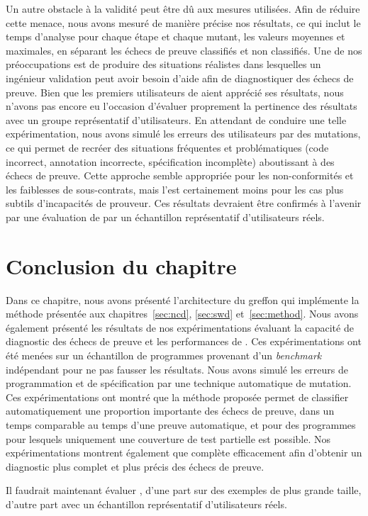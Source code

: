 Un autre obstacle à la validité peut être dû aux mesures utilisées.
Afin de réduire cette menace, nous avons mesuré de manière précise nos
résultats, ce qui inclut le temps d'analyse pour chaque étape et chaque mutant,
les valeurs moyennes et maximales, en séparant les échecs de preuve classifiés
et non classifiés.
Une de nos préoccupations est de produire des situations réalistes dans
lesquelles un ingénieur validation peut avoir besoin d'aide afin de
diagnostiquer des échecs de preuve.
Bien que les premiers utilisateurs de \stady aient apprécié ses résultats, nous
n'avons pas encore eu l'occasion d'évaluer proprement la pertinence des
résultats avec un groupe représentatif d'utilisateurs.
En attendant de conduire une telle expérimentation, nous avons simulé les
erreurs des utilisateurs par des mutations, ce qui permet de recréer des
situations fréquentes et problématiques (code incorrect, annotation incorrecte,
spécification incomplète) aboutissant à des échecs de preuve.
Cette approche semble appropriée pour les non-conformités et les faiblesses de
sous-contrats, mais l'est certainement moins pour les cas plus subtils
d'incapacités de prouveur.
Ces résultats devraient être confirmés à l'avenir par une évaluation de \stady
par un échantillon représentatif d'utilisateurs réels.


\section*{Conclusion du chapitre}


Dans ce chapitre, nous avons présenté l'architecture du greffon \stady qui
implémente la méthode présentée aux chapitres~\ref{sec:ncd}, \ref{sec:swd}
et~\ref{sec:method}.
Nous avons également présenté les résultats de nos expérimentations évaluant
la capacité de diagnostic des échecs de preuve et les performances de \stady.
Ces expérimentations ont été menées sur un échantillon de programmes provenant
d'un {\em benchmark} indépendant pour ne pas fausser les résultats.
Nous avons simulé les erreurs de programmation et de spécification par une
technique automatique de mutation.
Ces expérimentations ont montré que la méthode proposée permet de
classifier automatiquement une proportion importante des échecs de preuve, dans
un temps comparable au temps d'une preuve automatique, et pour des programmes
pour lesquels uniquement une couverture de test partielle est possible.
Nos expérimentations montrent également que \SWD complète efficacement \NCD afin
d'obtenir un diagnostic plus complet et plus précis des échecs de preuve.

Il faudrait maintenant évaluer \stady, d'une part sur des exemples de plus
grande taille, d'autre part avec un échantillon représentatif d'utilisateurs
réels.
